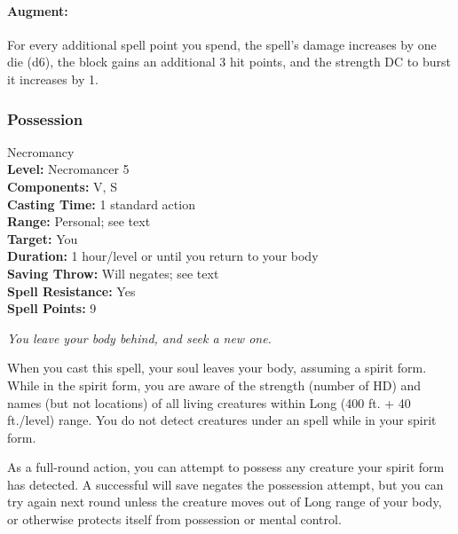 \paragraph{Augment:} For every additional spell point you spend, the spell's damage increases by one die (d6), the block gains an additional 3 hit points,
and the strength DC to burst it increases by 1.
\subsubsection{Possession}
\label{Spell:Possession}
Necromancy
\\ \textbf{Level:} Necromancer 5
\\ \textbf{Components:} V, S
\\ \textbf{Casting Time:} 1 standard action
\\ \textbf{Range:} Personal; see text
\\ \textbf{Target:} You
\\ \textbf{Duration:} 1 hour/level or until you return to your body
\\ \textbf{Saving Throw:} Will negates; see text
\\ \textbf{Spell Resistance:} Yes
\\ \textbf{Spell Points:} 9

\emph{You leave your body behind, and seek a new one.}

When you cast this spell, your soul leaves your body, assuming a spirit form.
While in the spirit form, you are aware of the strength (number of HD) and names (but not locations)
of all living creatures within Long (400 ft. + 40 ft./level) range. 
You do not detect creatures under an 
spell while in your spirit form.

As a full-round action, you can attempt to possess any creature your spirit form has detected.
A successful will save negates the possession attempt, but you can try again next round unless the 
creature moves out of Long range of your body, or otherwise protects itself from possession or mental control.

